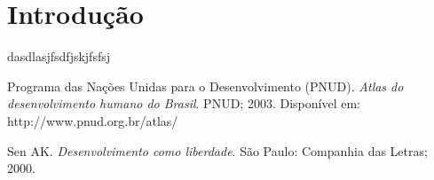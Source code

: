 \documentclass[conference]{IEEEtran}
\begin{document}
\IEEEpeerreviewmaketitle


\section{Introdução}

dasdlasjfsdfjskjfsfsj

\begin{thebibliography}{1}


Programa das Nações Unidas para o Desenvolvimento (PNUD). \emph{Atlas do desenvolvimento humano do Brasil}. PNUD; 2003. Disponível em: http://www.pnud.org.br/atlas/

Sen AK. \emph{Desenvolvimento como liberdade}. São Paulo: Companhia das Letras; 2000.


\end{thebibliography}




\end{document}
